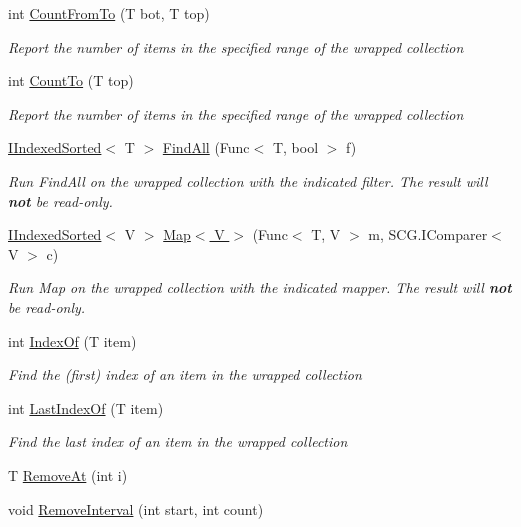 \begin{DoxyCompactItemize}
int \hyperlink{class_c5_1_1_guarded_indexed_sorted_af8a01e371525dfae61ddc323e16e1f9e}{Count\+From\+To} (T bot, T top)
\begin{DoxyCompactList}\small\item\em Report the number of items in the specified range of the wrapped collection \end{DoxyCompactList}\item 
int \hyperlink{class_c5_1_1_guarded_indexed_sorted_abfdc8d50b6ea0bf7493fbcf77c4ae19a}{Count\+To} (T top)
\begin{DoxyCompactList}\small\item\em Report the number of items in the specified range of the wrapped collection \end{DoxyCompactList}\item 
\hyperlink{interface_c5_1_1_i_indexed_sorted}{I\+Indexed\+Sorted}$<$ T $>$ \hyperlink{class_c5_1_1_guarded_indexed_sorted_ab5bc00909aa5b210f3de4f09e674d7b0}{Find\+All} (Func$<$ T, bool $>$ f)
\begin{DoxyCompactList}\small\item\em Run Find\+All on the wrapped collection with the indicated filter. The result will {\bfseries not} be read-\/only. \end{DoxyCompactList}\item 
\hyperlink{interface_c5_1_1_i_indexed_sorted}{I\+Indexed\+Sorted}$<$ V $>$ \hyperlink{class_c5_1_1_guarded_indexed_sorted_a9f01bb786e4abb2c27d3d38aedd47a70}{Map$<$ V $>$} (Func$<$ T, V $>$ m, S\+C\+G.\+I\+Comparer$<$ V $>$ c)
\begin{DoxyCompactList}\small\item\em Run Map on the wrapped collection with the indicated mapper. The result will {\bfseries not} be read-\/only. \end{DoxyCompactList}\item 
int \hyperlink{class_c5_1_1_guarded_indexed_sorted_aa13e57faa854dd70f28ac2dd8bb6f888}{Index\+Of} (T item)
\begin{DoxyCompactList}\small\item\em Find the (first) index of an item in the wrapped collection \end{DoxyCompactList}\item 
int \hyperlink{class_c5_1_1_guarded_indexed_sorted_a782d9e939a68f246af69adba83584164}{Last\+Index\+Of} (T item)
\begin{DoxyCompactList}\small\item\em Find the last index of an item in the wrapped collection \end{DoxyCompactList}\item 
T \hyperlink{class_c5_1_1_guarded_indexed_sorted_a0e84a6bb3bf610cdf68aa2583dc78155}{Remove\+At} (int i)
\item 
void \hyperlink{class_c5_1_1_guarded_indexed_sorted_a2c43f17a32750da03b1aa64a6300a091}{Remove\+Interval} (int start, int count)
\end{DoxyCompactItemize}
